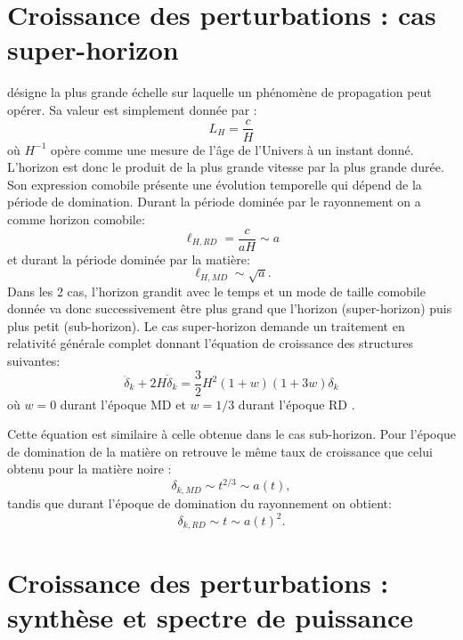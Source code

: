 \section{Croissance des perturbations : cas super-horizon}
 désigne la plus grande échelle sur laquelle un phénomène de propagation peut opérer. Sa valeur est simplement donnée par :
\begin{equation}
L_H=\frac{c}{H}
\end{equation}
où $H^{-1}$ opère comme une mesure de l'âge de l'Univers à un instant donné. L'horizon est donc le produit de la plus grande vitesse par la plus grande durée. Son expression comobile présente une évolution temporelle qui dépend de la période de domination. Durant la période dominée par le rayonnement on a comme horizon comobile:
\begin{equation}
\ell_{H,RD}=\frac{c}{aH}\sim a
\end{equation} 
et durant la période dominée par la matière:
\begin{equation}
\ell_{H,MD}\sim\sqrt{a}.
\end{equation}
Dans les 2 cas, l'horizon grandit avec le temps et un mode de taille comobile donnée va donc successivement être plus grand que l'horizon (super-horizon) puis plus petit (sub-horizon). Le cas super-horizon demande un traitement en relativité générale complet donnant l'équation de croissance des structures suivantes:
\begin{equation}
\ddot \delta_k + 2H \dot \delta_k = \frac{3}{2}H^2(1+w)(1+3w)\delta_k
\end{equation}
où $w=0$ durant l'époque MD et $w=1/3$ durant l'époque RD . 

Cette équation est similaire à celle obtenue dans le cas sub-horizon. Pour l'époque de domination de la matière on retrouve le même taux de croissance que celui obtenu pour la matière noire :
\begin{equation}
\delta_{k,MD}\sim t^{2/3}\sim a(t),
\end{equation}
tandis que durant l'époque de domination du rayonnement on obtient:
\begin{equation}
\delta_{k,RD}\sim t \sim a(t)^2.
\end{equation}


\section{Croissance des perturbations : synthèse et spectre de puissance}

